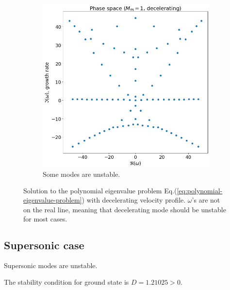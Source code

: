 \documentclass{article}
\theoremstyle{plain}
\theoremstyle{definition}
\theoremstyle{remark}
\theoremstyle{remark}
\begin{document}
\begin{figure}[H]
\begin{subfigure}[b]{0.5\linewidth}
        \includegraphics[width=\linewidth]{img/phase-space-decelerating.png}
        \caption{Some modes are unstable.}
    \end{subfigure}
    \caption{Solution to the polynomial eigenvalue problem Eq.(\ref{eq:polynomial-eigenvalue-problem}) with decelerating velocity profile. $\omega$'s are not on the real line, meaning that decelerating mode should be unstable for most cases.}
    \label{fig:decelerating}
\end{figure}

\newpage
\subsection{Supersonic case}
Supersonic modes are unstable.

The stability condition for ground state is $D=1.21025>0$.
\end{document}
